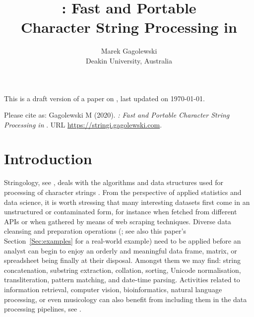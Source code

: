 \documentclass[nojss]{jss}
\author{Marek Gagolewski\\
Deakin University, Australia} %
\title{\pkg{stringi}: Fast and Portable\\Character String
Processing in \proglang{R}}
\begin{document}
{\color{blue}
This is a draft version of a paper on ,
last updated on \today.

Please cite as:
Gagolewski M (2020).
\textit{: Fast and Portable Character String Processing in }.
URL \url{https://stringi.gagolewski.com}.
}




\section{Introduction}\label{Sec:intro}

Stringology, see \citep{stringology},
deals with the algorithms and data structures used for processing
of character strings \citep{speechlangproc,szpankowski}.
From the perspective of applied statistics and data science,
it is worth stressing that many interesting datasets
first come in an unstructured or contaminated form,
for instance when fetched from different APIs or when gathered
by means of web scraping techniques.
Diverse data cleansing and preparation operations
(\citealp{datacleaning,cleanr}; see also
this paper's Section~\ref{Sec:examples} for a real-world example)
need to be applied before an analyst can begin to enjoy
an orderly and meaningful data frame, matrix, or spreadsheet  being finally
at their disposal.
Amongst them we may find: string concatenation,
substring extraction, collation, sorting, Unicode normalisation,
transliteration, pattern matching, and date-time parsing.
Activities related to information retrieval, computer vision,
bioinformatics, natural language processing, or even musicology
can also benefit from including them
in the data processing pipelines, see \citep{speechlangproc,genome}.






\end{document}
